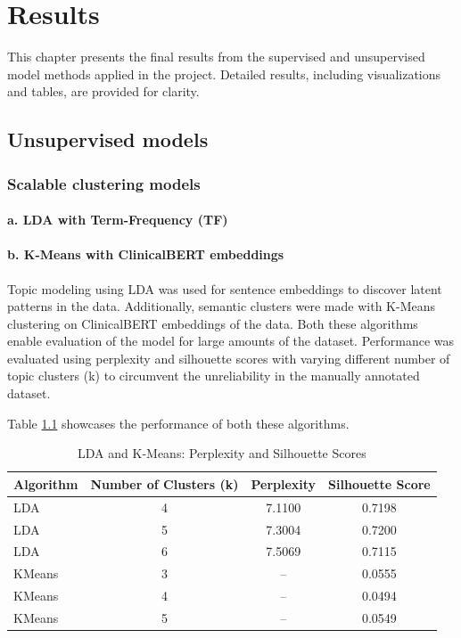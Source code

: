 \chapter{Results}

This chapter presents the final results from the supervised and unsupervised model methods applied in the project. Detailed results, including visualizations and tables, are provided for clarity.

\section{Unsupervised models}

\subsection{Scalable clustering models}
\subsubsection{a. LDA with Term-Frequency (TF)}
\subsubsection{b. K-Means with ClinicalBERT embeddings}
Topic modeling using LDA was used for sentence embeddings to discover latent patterns in the data. Additionally, semantic clusters were made with K-Means clustering on ClinicalBERT embeddings of the data. Both these algorithms enable evaluation of the model for large amounts of the dataset. Performance was evaluated using perplexity and silhouette scores with varying different number of topic clusters (k) to circumvent the unreliability in the manually annotated dataset.

Table \ref{tab:lda-kmeans-results} showcases the performance of both these algorithms.
\begin{table}[H]
\centering
\caption{LDA and K-Means: Perplexity and Silhouette Scores}
\label{tab:lda-kmeans-results}
\begin{tabular}{lccc}
\toprule
\textbf{Algorithm} & \textbf{Number of Clusters (k)} & \textbf{Perplexity} & \textbf{Silhouette Score} \\
\midrule
LDA & 4 & 7.1100 & 0.7198 \\[0.5ex]
LDA & 5 & 7.3004 & 0.7200 \\[0.5ex]
LDA & 6 & 7.5069 & 0.7115 \\[0.5ex]
KMeans & 3 & -- & 0.0555 \\[0.5ex]
KMeans & 4 & -- & 0.0494 \\[0.5ex]
KMeans & 5 & -- & 0.0549 \\
\bottomrule
\end{tabular}
\end{table}

